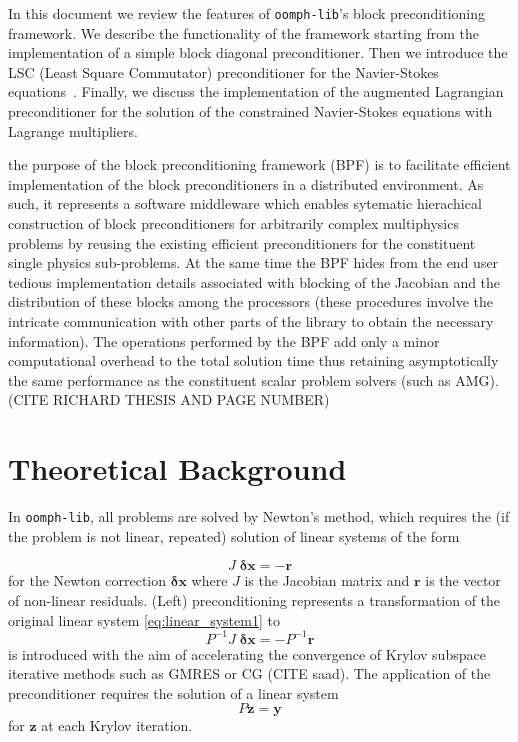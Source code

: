 In this document we review the features of \verb+oomph-lib+'s block 
preconditioning framework. We describe the functionality of the 
framework starting from the implementation of a simple block diagonal 
preconditioner. Then we introduce the LSC (Least Square Commutator) 
preconditioner for the Navier-Stokes equations~\cite{fastiterativesolvers}. 
Finally, we discuss the implementation of the augmented Lagrangian 
preconditioner for the solution of the constrained Navier-Stokes equations with
Lagrange multipliers.

the purpose of the block preconditioning framework (BPF) is to facilitate 
efficient implementation of the block preconditioners in a distributed 
environment. As such, it represents a software middleware which enables 
sytematic hierachical construction of block preconditioners for arbitrarily 
complex multiphysics problems by reusing the existing efficient preconditioners
for the constituent single physics sub-problems. At the same time the BPF hides
from the end user tedious implementation details associated with blocking of 
the Jacobian and the distribution of these blocks among the processors (these 
procedures involve the intricate communication with other parts of the library 
to obtain the necessary information). The operations performed by the BPF add 
only a minor computational overhead to the total solution time thus retaining 
asymptotically the same performance as the constituent scalar problem solvers 
(such as AMG). (CITE RICHARD THESIS AND PAGE NUMBER)

\section{ Theoretical Background\label{sec:theoretical_background}}
In \verb+oomph-lib+, all problems are solved by Newton's method, which requires
the (if the problem is not linear, repeated) solution of linear systems of the 
form

\begin{equation}
J\;\mathbf{\delta x} = -\mathbf{r}
\label{eq:linear_system1}
\end{equation}
for the Newton correction $\mathbf{\delta x}$ where $J$ is the
Jacobian matrix and $\mathbf{r}$ is the vector of non-linear residuals. (Left) 
preconditioning represents a transformation of the original linear system 
\eqref{eq:linear_system1} to
\begin{equation*}
P^{-1}J\;\mathbf{ \delta x}=-P^{-1}\mathbf{r}
\end{equation*}
is introduced with the aim of accelerating the convergence of Krylov subspace 
iterative methods such as GMRES or CG (CITE saad). The application of the 
preconditioner requires the solution of a linear system
\begin{equation*}
P\mathbf{z}=\mathbf{y}
\end{equation*}
for $\mathbf{z}$ at each Krylov iteration.

